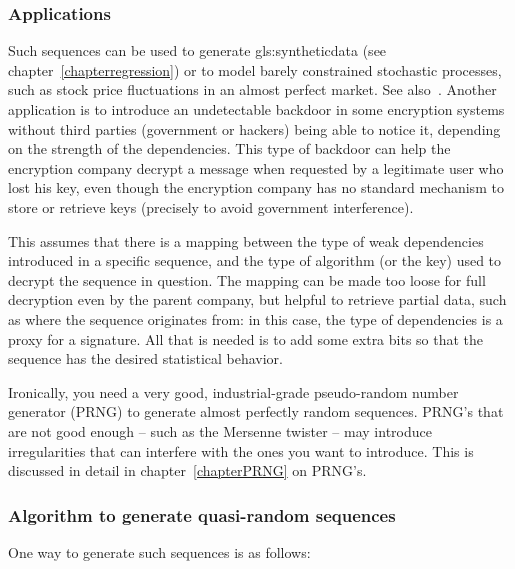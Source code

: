 \documentclass[oneside,10pt]{book}
\begin{document}
\subsubsection{Applications}

Such sequences can be used to generate \gls{gls:syntheticdata} (see chapter~\ref{chapterregression}) or to model barely constrained stochastic processes, such as stock price fluctuations in an almost perfect market. See also~\cite{pac203}. Another application is
 to introduce an undetectable backdoor in some encryption systems without third parties (government or hackers) being able to notice it, depending on the strength of the dependencies. This type of backdoor can help the encryption company decrypt a message when requested by a
 legitimate user who lost his key, even though the encryption company has no standard mechanism to store or retrieve keys (precisely to avoid government interference).

This assumes that there is a mapping between the  type of weak dependencies introduced in a specific sequence, and the
 type of algorithm (or the key) used to decrypt the sequence in question. The mapping can be made too loose for full decryption even by the parent company, but helpful to retrieve partial data, such as where the sequence originates from: in this case, the type of dependencies is a proxy for a signature. All that is needed is to add some extra bits so that the sequence has the desired statistical behavior.

Ironically, you need a very good, industrial-grade \textcolor{index}{pseudo-random number generator} (PRNG) to generate almost perfectly random sequences. PRNG's that are not good enough -- such as the \textcolor{index}{Mersenne twister} -- may introduce irregularities that can interfere with the ones you want to introduce. This is discussed
 in detail in chapter~\ref{chapterPRNG} on PRNG's.

\subsubsection{Algorithm to generate quasi-random sequences}\label{qrrnd}

One way to generate such sequences is as follows: \vspace{1ex}
\end{document}
